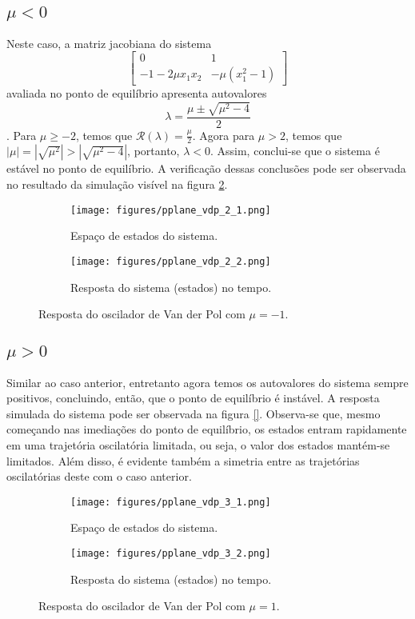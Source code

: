 \documentclass[a4paper]{report}
\begin{document}
\subsection*{$\mu<0$}

Neste caso, a matriz jacobiana do sistema \[
    \begin{bmatrix} 0 & 1 \\ -1-2\mu x_1x_2 & -\mu (x_1^2-1) \end{bmatrix} 
\] avaliada no ponto de equilíbrio apresenta autovalores \[
    \lambda = \frac{\mu \pm \sqrt{\mu^2 - 4} }{2}
\]. Para $\mu \ge  -2$, temos que $\mathcal{R}(\lambda) = \frac{\mu}{2}$. Agora para $\mu > 2$, temos que $|\mu| = |\sqrt{\mu^2}| > |\sqrt{\mu^2 - 4}|$, portanto, $\lambda < 0$. Assim, conclui-se que o sistema é estável no ponto de equilíbrio. A verificação dessas conclusões pode ser observada no resultado da simulação visível na figura \ref{fig:figures-pplane_vdp_2}.

\begin{figure}[H]
    \centering
    \begin{subfigure}{0.45\textwidth}
	\texttt{[image: figures/pplane\_vdp\_2\_1.png]}
	\caption{Espaço de estados do sistema.}
    \end{subfigure}
    \begin{subfigure}{0.45\textwidth}
	\texttt{[image: figures/pplane\_vdp\_2\_2.png]}
	\caption{Resposta do sistema (estados) no tempo.}
    \end{subfigure}
    \caption{Resposta do oscilador de Van der Pol com $\mu=-1$.}
    \label{fig:figures-pplane_vdp_2}
\end{figure}

\subsection*{$\mu>0$}

Similar ao caso anterior, entretanto agora temos os autovalores do sistema sempre positivos, concluindo, então, que o ponto de equilíbrio é instável. A resposta simulada do sistema pode ser observada na figura \ref{}. Observa-se que, mesmo começando nas imediações do ponto de equilíbrio, os estados entram rapidamente em uma trajetória oscilatória limitada, ou seja, o valor dos estados mantém-se limitados. Além disso, é evidente também a simetria entre as trajetórias oscilatórias deste com o caso anterior.

\begin{figure}[H]
    \centering
    \begin{subfigure}{0.45\textwidth}
	\texttt{[image: figures/pplane\_vdp\_3\_1.png]}
	\caption{Espaço de estados do sistema.}
    \end{subfigure}
    \begin{subfigure}{0.45\textwidth}
	\texttt{[image: figures/pplane\_vdp\_3\_2.png]}
	\caption{Resposta do sistema (estados) no tempo.}
    \end{subfigure}
    \caption{Resposta do oscilador de Van der Pol com $\mu=1$.}
    \label{fig:figures-pplane_vdp_2}
\end{figure}
\end{document}
